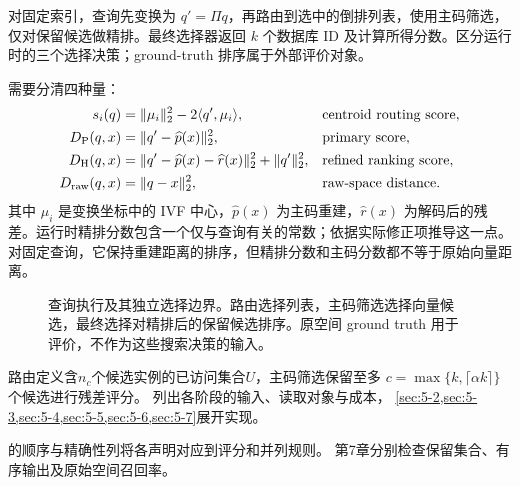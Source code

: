对固定索引，查询先变换为 $q'=\Pi q$，再路由到选中的倒排列表，使用主码筛选，仅对保留候选做精排。最终选择器返回 $k$ 个数据库 ID 及计算所得分数。区分运行时的三个选择决策；ground-truth 排序属于外部评价对象。

需要分清四种量：
\begin{align}
 s_i(q)&=\|\mu_i\|_2^2-2\langle q',\mu_i\rangle,
                   &&\text{centroid routing score},\nonumber\\
 D_{\mathrm{P}}(q,x)&=\|q'-\widehat p(x)\|_2^2,
                   &&\text{primary score},\nonumber\\
 D_{\mathrm{H}}(q,x)&=\|q'-\widehat p(x)-\widehat r(x)\|_2^2
                       +\|q'\|_2^2,
                   &&\text{refined ranking score},\nonumber\\
 D_{\mathrm{raw}}(q,x)&=\|q-x\|_2^2,
                   &&\text{raw-space distance}.
 \label{eq:5-ranking-objects}
\end{align}
其中 $\mu_i$ 是变换坐标中的 IVF 中心，$\widehat p(x)$ 为主码重建，$\widehat r(x)$ 为解码后的残差。运行时精排分数包含一个仅与查询有关的常数；依据实际修正项推导这一点。对固定查询，它保持重建距离的排序，但精排分数和主码分数都不等于原始向量距离。

\begin{figure}[tbp]
\centering

\caption[查询阶段与选择边界]{查询执行及其独立选择边界。路由选择列表，主码筛选选择向量候选，最终选择对精排后的保留候选排序。原空间 ground truth 用于评价，不作为这些搜索决策的输入。}
\label{fig:5-query-path}
\end{figure}

路由定义含$n_c$个候选实例的已访问集合$U$，主码筛选保留至多
$c=\max\{k,\lceil\alpha k\rceil\}$个候选进行残差评分。
列出各阶段的输入、读取对象与成本，
\cref{sec:5-2,sec:5-3,sec:5-4,sec:5-5,sec:5-6,sec:5-7}展开实现。

的顺序与精确性列将各声明对应到评分和并列规则。
第7章分别检查保留集合、有序输出及原始空间召回率。


